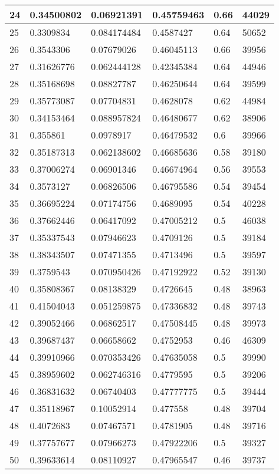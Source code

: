 \begin{longtable}{|l|l|l|l|l|l|}
24 & 0.34500802 & 0.06921391 & 0.45759463 & 0.66 & 44029 \\ \hline 
25 & 0.3309834 & 0.084174484 & 0.4587427 & 0.64 & 50652 \\ \hline 
26 & 0.3543306 & 0.07679026 & 0.46045113 & 0.66 & 39956 \\ \hline 
27 & 0.31626776 & 0.062444128 & 0.42345384 & 0.64 & 44946 \\ \hline 
28 & 0.35168698 & 0.08827787 & 0.46250644 & 0.64 & 39599 \\ \hline 
29 & 0.35773087 & 0.07704831 & 0.4628078 & 0.62 & 44984 \\ \hline 
30 & 0.34153464 & 0.088957824 & 0.46480677 & 0.62 & 38906 \\ \hline 
31 & 0.355861 & 0.0978917 & 0.46479532 & 0.6 & 39966 \\ \hline 
32 & 0.35187313 & 0.062138602 & 0.46685636 & 0.58 & 39180 \\ \hline 
33 & 0.37006274 & 0.06901346 & 0.46674964 & 0.56 & 39553 \\ \hline 
34 & 0.3573127 & 0.06826506 & 0.46795586 & 0.54 & 39454 \\ \hline 
35 & 0.36695224 & 0.07174756 & 0.4689095 & 0.54 & 40228 \\ \hline 
36 & 0.37662446 & 0.06417092 & 0.47005212 & 0.5 & 46038 \\ \hline 
37 & 0.35337543 & 0.07946623 & 0.4709126 & 0.5 & 39184 \\ \hline 
38 & 0.38343507 & 0.07471355 & 0.4713496 & 0.5 & 39597 \\ \hline 
39 & 0.3759543 & 0.070950426 & 0.47192922 & 0.52 & 39130 \\ \hline 
40 & 0.35808367 & 0.08138329 & 0.4726645 & 0.48 & 38963 \\ \hline 
41 & 0.41504043 & 0.051259875 & 0.47336832 & 0.48 & 39743 \\ \hline 
42 & 0.39052466 & 0.06862517 & 0.47508445 & 0.48 & 39973 \\ \hline 
43 & 0.39687437 & 0.06658662 & 0.4752953 & 0.46 & 46309 \\ \hline 
44 & 0.39910966 & 0.070353426 & 0.47635058 & 0.5 & 39990 \\ \hline 
45 & 0.38959602 & 0.062746316 & 0.4779595 & 0.5 & 39206 \\ \hline 
46 & 0.36831632 & 0.06740403 & 0.47777775 & 0.5 & 39444 \\ \hline 
47 & 0.35118967 & 0.10052914 & 0.477558 & 0.48 & 39704 \\ \hline 
48 & 0.4072683 & 0.07467571 & 0.4781905 & 0.48 & 39716 \\ \hline 
49 & 0.37757677 & 0.07966273 & 0.47922206 & 0.5 & 39327 \\ \hline 
50 & 0.39633614 & 0.08110927 & 0.47965547 & 0.46 & 39737 \\ \hline 
\end{longtable}